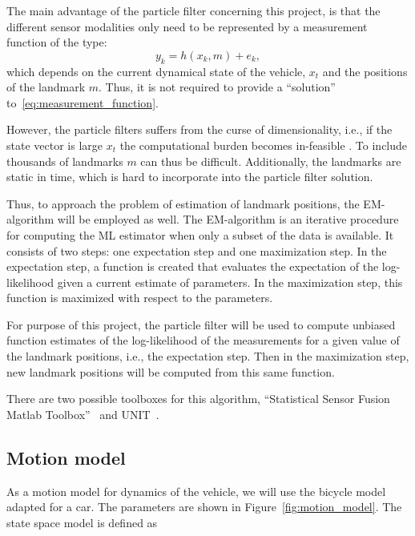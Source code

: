 The main advantage of the particle filter concerning this project, is that the
different sensor modalities only need to be represented by a measurement function
of the type:
\begin{equation}
  \label{eq:measurement_function}
  y_k = h(x_k, m) + e_k,
\end{equation}
which depends on the current dynamical state of the vehicle, $x_t$ and
the positions of the landmark $m$. Thus, it is not required to provide
a ``solution'' to~\eqref{eq:measurement_function}.

However, the particle filters suffers from the curse of
dimensionality, i.e., if the state vector is large $x_t$ the
computational burden becomes in-feasible \cite{1453762}. To include
thousands of landmarks $m$ can thus be difficult. Additionally, the
landmarks are static in time, which is hard to incorporate into the
particle filter solution.

Thus, to approach the problem of estimation of landmark positions, the
\gls{EM}-algorithm \cite{Dempster77maximumlikelihood} will be employed
as well. The \gls{EM}-algorithm is an iterative procedure for computing
the \gls{ML} estimator when only a subset of the data is available. It
consists of two steps: one expectation step and one maximization
step. In the expectation step, a function is created that evaluates
the expectation of the log-likelihood given a current estimate of
parameters. In the maximization step, this function is maximized with
respect to the parameters.

For purpose of this project, the particle filter will be used to compute
unbiased function estimates of the log-likelihood of the measurements for a
given value of the landmark positions, i.e., the expectation step.  Then in the maximization step,
new landmark positions will be computed from this same function.

There are two possible toolboxes for this algorithm, ``Statistical
Sensor Fusion Matlab Toolbox''~\cite{gustafsson2010statistical} and
\gls{UNIT}~\cite{NINNESS2013631}.


\subsection{Motion model}

As a motion model for dynamics of the vehicle, we will use the bicycle model
adapted for a
car.
The parameters are shown in Figure~\ref{fig:motion_model}. The state space
model is defined as

